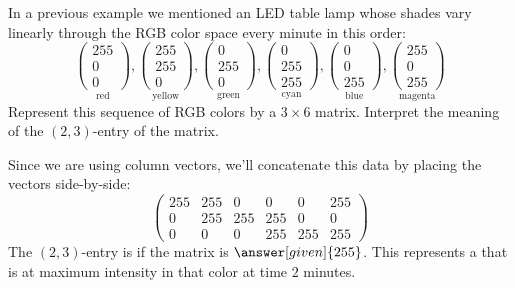 \documentclass{ximera}
\begin{document}
\begin{example}
  In a previous example we mentioned an LED table lamp whose shades
  vary linearly through the RGB color space every minute in this
  order:
      \[
    \underset{\text{red}}{\begin{pmatrix}255\\0\\0\end{pmatrix}},
    \underset{\text{yellow}}{\begin{pmatrix}255\\255\\0\end{pmatrix}},
    \underset{\text{green}}{\begin{pmatrix}0\\255\\0\end{pmatrix}},
    \underset{\text{cyan}}{\begin{pmatrix}0\\255\\255\end{pmatrix}},
    \underset{\text{blue}}{\begin{pmatrix}0\\0\\255\end{pmatrix}},
    \underset{\text{magenta}}{\begin{pmatrix}255\\0\\255\end{pmatrix}}
    \]
  Represent this sequence of RGB colors by a $3 \times 6$
  matrix. Interpret the meaning of the $(2,3)$-entry of the matrix.
  \begin{explanation}
    Since we are using column vectors, we'll concatenate this data by
    placing the vectors side-by-side:
    \[
      \begin{pmatrix}
        255 & 255 & 0 & 0 & 0 & 255\\
        0 & 255& 255 & 255 & 0 & 0 \\
        0 & 0 & 0 & 255 & 255 & 255
      \end{pmatrix}
    \]
    The $(2,3)$-entry is if the matrix is $\answer[given]{255}$. This
    represents a that
    is at maximum intensity in that color at time $2$ minutes.
  \end{explanation}
\end{example}
\end{document}
